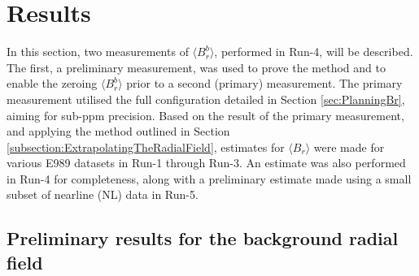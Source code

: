 \section{Results}

In this section, two measurements of $\langle B_{r}^{b} \rangle$, performed in Run-4, will be described. The first, a preliminary measurement, was used to prove the method and to enable the zeroing $\langle B_{r}^{b} \rangle$ prior to a second (primary) measurement. The primary measurement utilised the full configuration detailed in Section \ref{sec:PlanningBr}, aiming for sub-ppm precision. Based on the result of the primary measurement, and applying the method outlined in Section \ref{subsection:ExtrapolatingTheRadialField}, estimates for $\langle B_{r} \rangle$ were made for various E989 datasets in Run-1 through Run-3. An estimate was also performed in Run-4 for completeness, along with a preliminary estimate made using a small subset of nearline (NL) data in Run-5.

\subsection{Preliminary results for the background radial field}

